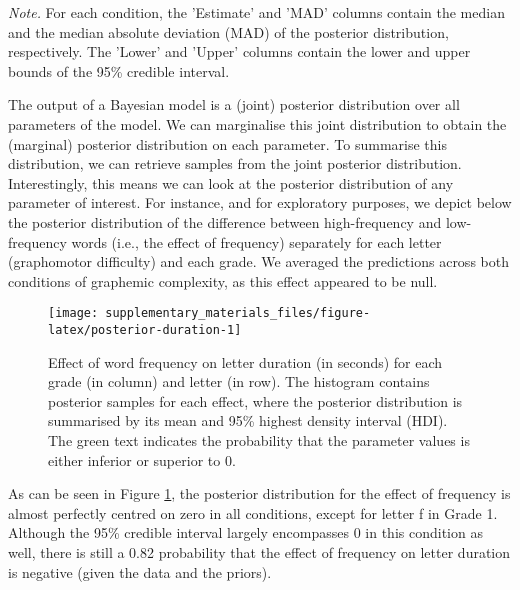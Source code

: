 \documentclass[
  11pt,
  english,
  ,doc,floatsintext]{apa6}
\begin{document}
\begin{table}[htb]
\begin{center}
\begin{threeparttable}
{}

\begin{tablenotes}[para]
\normalsize{\textit{Note.} For each condition, the 'Estimate' and 'MAD' columns contain the
    median and the median absolute deviation (MAD) of the posterior distribution,
    respectively. The 'Lower' and 'Upper' columns contain the lower and upper
    bounds of the 95\% credible interval.}
\end{tablenotes}

\end{threeparttable}
\end{center}

\end{table}

The output of a Bayesian model is a (joint) posterior distribution over all parameters of the model. We can marginalise this joint distribution to obtain the (marginal) posterior distribution on each parameter. To summarise this distribution, we can retrieve samples from the joint posterior distribution. Interestingly, this means we can look at the posterior distribution of any parameter of interest. For instance, and for exploratory purposes, we depict below the posterior distribution of the difference between high-frequency and low-frequency words (i.e., the effect of frequency) separately for each letter (graphomotor difficulty) and each grade. We averaged the predictions across both conditions of graphemic complexity, as this effect appeared to be null.

\begin{figure}[!htb]

{\centering \texttt{[image: supplementary\_materials\_files/figure-latex/posterior-duration-1]} 

}

\caption{Effect of word frequency on letter duration (in seconds) for each grade (in column) and letter (in row). The histogram contains posterior samples for each effect, where the posterior distribution is summarised by its mean and 95\% highest density interval (HDI). The green text indicates the probability that the parameter values is either inferior or superior to 0.}\label{fig:posterior-duration}
\end{figure}

As can be seen in Figure \ref{fig:posterior-duration}, the posterior distribution for the effect of frequency is almost perfectly centred on zero in all conditions, except for letter f in Grade 1. Although the 95\% credible interval largely encompasses 0 in this condition as well, there is still a 0.82 probability that the effect of frequency on letter duration is negative (given the data and the priors).
\end{document}
